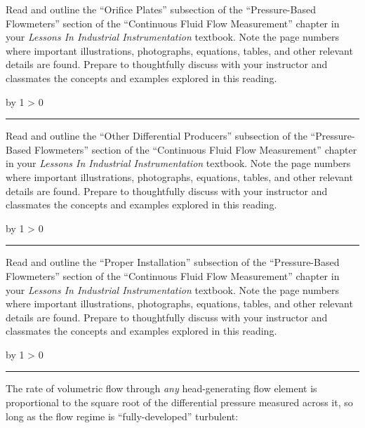 \documentclass[12pt,a4paper]{article}
\def\oppgave{
            \advance\questnum by 1
            \ifnum \questnum > 0
                 \hrule
                 \vskip 3pt
                 \leftline{Oppgave \the\questnum}
                 \vskip 3pt \fi}
\begin{document}
Read and outline the ``Orifice Plates'' subsection of the ``Pressure-Based Flowmeters'' section of the ``Continuous Fluid Flow Measurement'' chapter in your {\it Lessons In Industrial Instrumentation} textbook.  Note the page numbers where important illustrations, photographs, equations, tables, and other relevant details are found.  Prepare to thoughtfully discuss with your instructor and classmates the concepts and examples explored in this reading.

\vskip 10pt \filbreak 
\oppgave{} 

Read and outline the ``Other Differential Producers'' subsection of the ``Pressure-Based Flowmeters'' section of the ``Continuous Fluid Flow Measurement'' chapter in your {\it Lessons In Industrial Instrumentation} textbook.  Note the page numbers where important illustrations, photographs, equations, tables, and other relevant details are found.  Prepare to thoughtfully discuss with your instructor and classmates the concepts and examples explored in this reading.

\vskip 10pt \filbreak 
\oppgave{} 

Read and outline the ``Proper Installation'' subsection of the ``Pressure-Based Flowmeters'' section of the ``Continuous Fluid Flow Measurement'' chapter in your {\it Lessons In Industrial Instrumentation} textbook.  Note the page numbers where important illustrations, photographs, equations, tables, and other relevant details are found.  Prepare to thoughtfully discuss with your instructor and classmates the concepts and examples explored in this reading.

\vskip 10pt \filbreak 
\oppgave{} 

The rate of volumetric flow through {\it any} head-generating flow element is proportional to the square root of the differential pressure measured across it, so long as the flow regime is ``fully-developed'' turbulent:
\end{document}

